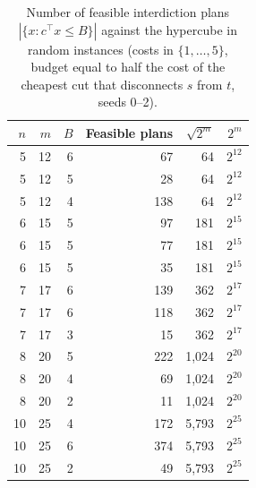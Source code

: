\begin{table}[t]
\centering
\caption{Number of feasible interdiction plans $|\{x : c^\top x\le B\}|$ against the hypercube in random instances (costs in $\{1,\dots,5\}$, budget equal to half the cost of the cheapest cut that disconnects $s$ from $t$, seeds 0--2).}\label{tab:feasible-vs-hypercube}
\small
\begin{tabular}{rrrrrr}
\toprule
$n$ & $m$ & $B$ & Feasible plans & $\sqrt{2^m}$ & $2^m$ \\
\midrule
5 & 12 & 6 & 67 & 64 & $2^{12}$ \\
5 & 12 & 5 & 28 & 64 & $2^{12}$ \\
5 & 12 & 4 & 138 & 64 & $2^{12}$ \\
6 & 15 & 5 & 97 & 181 & $2^{15}$ \\
6 & 15 & 5 & 77 & 181 & $2^{15}$ \\
6 & 15 & 5 & 35 & 181 & $2^{15}$ \\
7 & 17 & 6 & 139 & 362 & $2^{17}$ \\
7 & 17 & 6 & 118 & 362 & $2^{17}$ \\
7 & 17 & 3 & 15 & 362 & $2^{17}$ \\
8 & 20 & 5 & 222 & 1{,}024 & $2^{20}$ \\
8 & 20 & 4 & 69 & 1{,}024 & $2^{20}$ \\
8 & 20 & 2 & 11 & 1{,}024 & $2^{20}$ \\
10 & 25 & 4 & 172 & 5{,}793 & $2^{25}$ \\
10 & 25 & 6 & 374 & 5{,}793 & $2^{25}$ \\
10 & 25 & 2 & 49 & 5{,}793 & $2^{25}$ \\
\bottomrule
\end{tabular}
\end{table}
